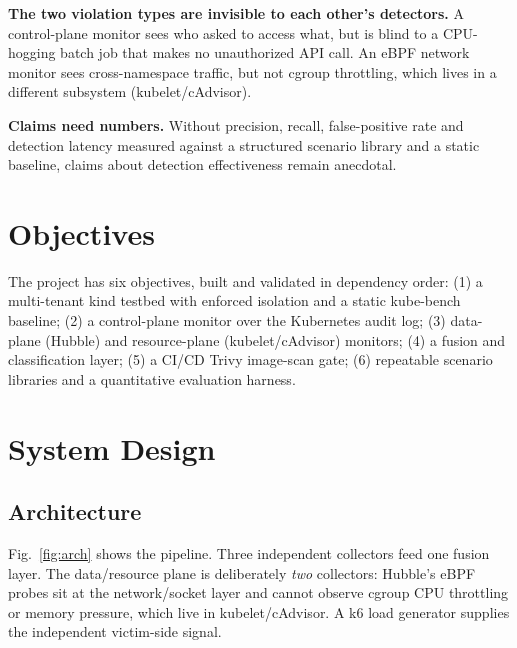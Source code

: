 \documentclass[conference]{IEEEtran}
\begin{document}
\textbf{The two violation types are invisible to each other's detectors.} A control-plane monitor sees who asked to access what, but is blind to a CPU-hogging batch job that makes no unauthorized API call. An eBPF network monitor sees cross-namespace traffic, but not cgroup throttling, which lives in a different subsystem (kubelet/cAdvisor).

\textbf{Claims need numbers.} Without precision, recall, false-positive rate and detection latency measured against a structured scenario library and a static baseline, claims about detection effectiveness remain anecdotal.

\section{Objectives}
The project has six objectives, built and validated in dependency order: (1) a multi-tenant kind testbed with enforced isolation and a static kube-bench baseline; (2) a control-plane monitor over the Kubernetes audit log; (3) data-plane (Hubble) and resource-plane (kubelet/cAdvisor) monitors; (4) a fusion and classification layer; (5) a CI/CD Trivy image-scan gate; (6) repeatable scenario libraries and a quantitative evaluation harness.

\section{System Design}
\subsection{Architecture}
Fig.~\ref{fig:arch} shows the pipeline. Three independent collectors feed one fusion layer. The data/resource plane is deliberately \emph{two} collectors: Hubble's eBPF probes sit at the network/socket layer and cannot observe cgroup CPU throttling or memory pressure, which live in kubelet/cAdvisor. A k6 load generator supplies the independent victim-side signal.
\end{document}
